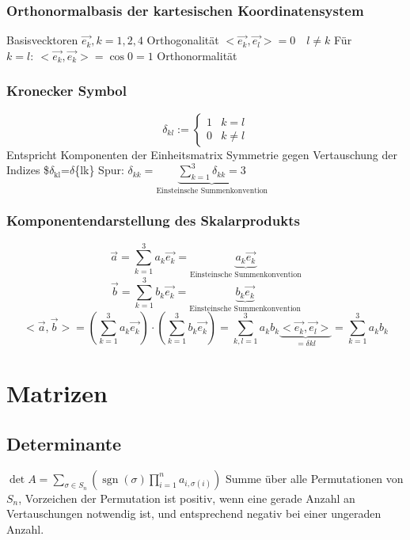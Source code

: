 \documentclass[11pt]{article}
\begin{document}
\subsubsection{Orthonormalbasis der kartesischen Koordinatensystem}
\label{sec-12-2-6}
Basisvecktoren $\vec{e_k}, k=1,2,4$
Orthogonalität $<\vec{e_k},\vec{e_l}> = 0\quad l\neq k$
Für $k=l:~<\vec{e_k},\vec{e_k}>=\cos{0}=1$
Orthonormalität
\subsubsection{Kronecker Symbol}
\label{sec-12-2-7}
\[\delta_{kl}:=\begin{cases}1&k=l\\0&k\neq l\end{cases}\]
Entspricht Komponenten der Einheitsmatrix
Symmetrie gegen Vertauschung der Indizes \$$\delta$$_{\text{kl}}$=$\delta$\{lk\}
Spur: $\delta_{kk} = \underbrace{\sum_{k=1}^3 \delta_{kk}=3}_{\text{Einsteinsche Summenkonvention}}$
\subsubsection{Komponentendarstellung des Skalarprodukts}
\label{sec-12-2-8}
\[\vec{a}=\sum_{k=1}^3 a_k \vec{e_k}=\underbrace{a_k \vec{e_k}}_{\text{Einsteinsche Summenkonvention}}\]
\[\vec{b}=\sum_{k=1}^3 b_k \vec{e_k}=\underbrace{b_k \vec{e_k}}_{\text{Einsteinsche Summenkonvention}}\]
\[<\vec{a},\vec{b}>=(\sum_{k=1}^3 a_k\vec{e_k})\cdot (\sum_{k=1}^3 b_k\vec{e_k}) = \sum_{k,l=1}^3 a_k b_k \underbrace{<\vec{e_k},\vec{e_l}>}_{=\delta{kl}} = \sum_{k=1}^3 a_k b_k\]
\section{Matrizen}
\label{sec-13}
\subsection{Determinante}
\label{sec-13-1}
$\det A = \sum_{\sigma \in S_n} \left(\operatorname{sgn}(\sigma) \prod_{i=1}^n a_{i, \sigma(i)}\right)$
Summe über alle Permutationen von $S_n$, Vorzeichen der Permutation ist positiv, wenn eine gerade Anzahl an Vertauschungen notwendig ist, und entsprechend negativ bei einer ungeraden Anzahl.
\end{document}
